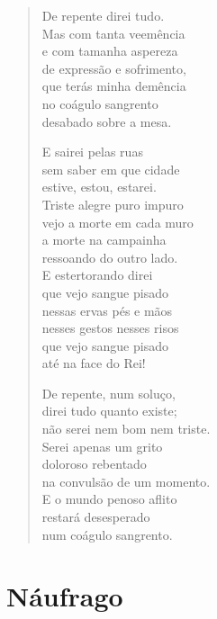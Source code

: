 \documentclass[10pt,a5paper,oneside]{book}
\begin{document}
\begin{verse}
De repente direi tudo.\\
Mas com tanta veemência\\
e com tamanha aspereza\\
de expressão e sofrimento,\\
que terás minha demência\\
no coágulo sangrento\\
desabado sobre a mesa.

E sairei pelas ruas\\
sem saber em que cidade\\
estive, estou, estarei.\\
Triste alegre puro impuro\\
vejo a morte em cada muro\\
a morte na campainha\\
ressoando do outro lado.\\
E estertorando direi\\
que vejo sangue pisado\\
nessas ervas pés e mãos\\
nesses gestos nesses risos\\
que vejo sangue pisado\\
até na face do Rei!

De repente, num soluço,\\
direi tudo quanto existe;\\
não serei nem bom nem triste.\\
Serei apenas um grito\\
doloroso rebentado\\
na convulsão de um momento.\\
E o mundo penoso aflito\\
restará desesperado\\
num coágulo sangrento.
\end{verse}

\chapter{Náufrago}
\end{document}
